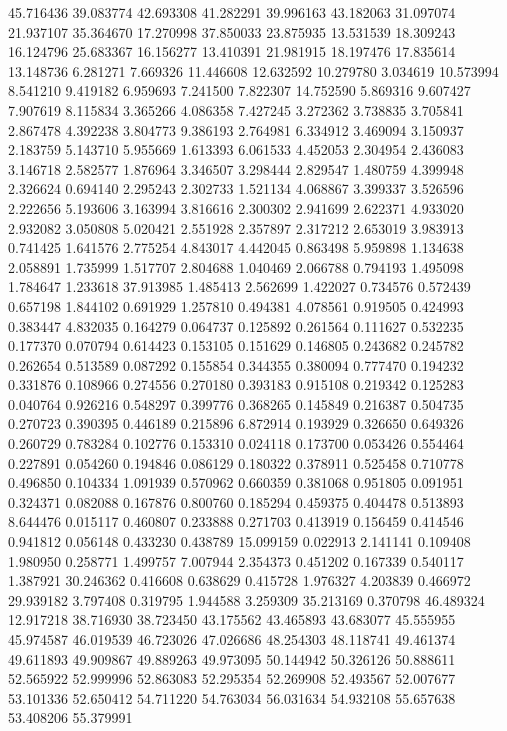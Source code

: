 45.716436
39.083774
42.693308
41.282291
39.996163
43.182063
31.097074
21.937107
35.364670
17.270998
37.850033
23.875935
13.531539
18.309243
16.124796
25.683367
16.156277
13.410391
21.981915
18.197476
17.835614
13.148736
6.281271
7.669326
11.446608
12.632592
10.279780
3.034619
10.573994
8.541210
9.419182
6.959693
7.241500
7.822307
14.752590
5.869316
9.607427
7.907619
8.115834
3.365266
4.086358
7.427245
3.272362
3.738835
3.705841
2.867478
4.392238
3.804773
9.386193
2.764981
6.334912
3.469094
3.150937
2.183759
5.143710
5.955669
1.613393
6.061533
4.452053
2.304954
2.436083
3.146718
2.582577
1.876964
3.346507
3.298444
2.829547
1.480759
4.399948
2.326624
0.694140
2.295243
2.302733
1.521134
4.068867
3.399337
3.526596
2.222656
5.193606
3.163994
3.816616
2.300302
2.941699
2.622371
4.933020
2.932082
3.050808
5.020421
2.551928
2.357897
2.317212
2.653019
3.983913
0.741425
1.641576
2.775254
4.843017
4.442045
0.863498
5.959898
1.134638
2.058891
1.735999
1.517707
2.804688
1.040469
2.066788
0.794193
1.495098
1.784647
1.233618
37.913985
1.485413
2.562699
1.422027
0.734576
0.572439
0.657198
1.844102
0.691929
1.257810
0.494381
4.078561
0.919505
0.424993
0.383447
4.832035
0.164279
0.064737
0.125892
0.261564
0.111627
0.532235
0.177370
0.070794
0.614423
0.153105
0.151629
0.146805
0.243682
0.245782
0.262654
0.513589
0.087292
0.155854
0.344355
0.380094
0.777470
0.194232
0.331876
0.108966
0.274556
0.270180
0.393183
0.915108
0.219342
0.125283
0.040764
0.926216
0.548297
0.399776
0.368265
0.145849
0.216387
0.504735
0.270723
0.390395
0.446189
0.215896
6.872914
0.193929
0.326650
0.649326
0.260729
0.783284
0.102776
0.153310
0.024118
0.173700
0.053426
0.554464
0.227891
0.054260
0.194846
0.086129
0.180322
0.378911
0.525458
0.710778
0.496850
0.104334
1.091939
0.570962
0.660359
0.381068
0.951805
0.091951
0.324371
0.082088
0.167876
0.800760
0.185294
0.459375
0.404478
0.513893
8.644476
0.015117
0.460807
0.233888
0.271703
0.413919
0.156459
0.414546
0.941812
0.056148
0.433230
0.438789
15.099159
0.022913
2.141141
0.109408
1.980950
0.258771
1.499757
7.007944
2.354373
0.451202
0.167339
0.540117
1.387921
30.246362
0.416608
0.638629
0.415728
1.976327
4.203839
0.466972
29.939182
3.797408
0.319795
1.944588
3.259309
35.213169
0.370798
46.489324
12.917218
38.716930
38.723450
43.175562
43.465893
43.683077
45.555955
45.974587
46.019539
46.723026
47.026686
48.254303
48.118741
49.461374
49.611893
49.909867
49.889263
49.973095
50.144942
50.326126
50.888611
52.565922
52.999996
52.863083
52.295354
52.269908
52.493567
52.007677
53.101336
52.650412
54.711220
54.763034
56.031634
54.932108
55.657638
53.408206
55.379991
